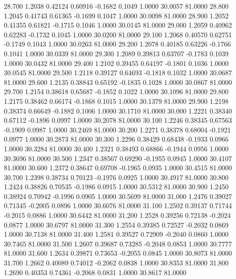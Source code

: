   28.700   1.2038   0.42124   0.60916  -0.1682   0.1049   1.0000  30.0057  81.0000
  28.800   1.2045   0.41743   0.61365  -0.1699   0.1047   1.0000  30.0098  81.0000
  28.900   1.2052   0.41355   0.61821  -0.1715   0.1046   1.0000  30.0145  81.0000
  29.000   1.2059   0.40962   0.62283  -0.1732   0.1045   1.0000  30.0200  81.0000
  29.100   1.2068   0.40570   0.62751  -0.1749   0.1043   1.0000  30.0263  81.0000
  29.200   1.2078   0.40185   0.63226  -0.1766   0.1041   1.0000  30.0339  81.0000
  29.300   1.2089   0.39813   0.63707  -0.1783   0.1039   1.0000  30.0432  81.0000
  29.400   1.2102   0.39455   0.64197  -0.1801   0.1036   1.0000  30.0545  81.0000
  29.500   1.2118   0.39127   0.64693  -0.1818   0.1032   1.0000  30.0687  81.0000
  29.600   1.2135   0.38843   0.65192  -0.1835   0.1028   1.0000  30.0867  81.0000
  29.700   1.2154   0.38618   0.65687  -0.1852   0.1022   1.0000  30.1096  81.0000
  29.800   1.2175   0.38462   0.66174  -0.1868   0.1015   1.0000  30.1379  81.0000
  29.900   1.2198   0.38374   0.66649  -0.1882   0.1006   1.0000  30.1710  81.0000
  30.000   1.2221   0.38340   0.67112  -0.1896   0.0997   1.0000  30.2078  81.0000
  30.100   1.2246   0.38345   0.67563  -0.1909   0.0987   1.0000  30.2469  81.0000
  30.200   1.2271   0.38378   0.68004  -0.1921   0.0977   1.0000  30.2873  81.0000
  30.300   1.2296   0.38429   0.68438  -0.1933   0.0966   1.0000  30.3284  81.0000
  30.400   1.2321   0.38493   0.68866  -0.1944   0.0956   1.0000  30.3696  81.0000
  30.500   1.2347   0.38567   0.69290  -0.1955   0.0945   1.0000  30.4107  81.0000
  30.600   1.2372   0.38647   0.69708  -0.1965   0.0935   1.0000  30.4515  81.0000
  30.700   1.2398   0.38734   0.70123  -0.1976   0.0925   1.0000  30.4917  81.0000
  30.800   1.2424   0.38826   0.70535  -0.1986   0.0915   1.0000  30.5312  81.0000
  30.900   1.2450   0.38924   0.70942  -0.1996   0.0905   1.0000  30.5699  81.0000
  31.000   1.2476   0.39027   0.71345  -0.2005   0.0896   1.0000  30.6076  81.0000
  31.100   1.2502   0.39137   0.71744  -0.2015   0.0886   1.0000  30.6442  81.0000
  31.200   1.2528   0.39256   0.72138  -0.2024   0.0877   1.0000  30.6797  81.0000
  31.300   1.2554   0.39385   0.72527  -0.2032   0.0869   1.0000  30.7138  81.0000
  31.400   1.2581   0.39527   0.72909  -0.2040   0.0860   1.0000  30.7465  81.0000
  31.500   1.2607   0.39687   0.73285  -0.2048   0.0853   1.0000  30.7777  81.0000
  31.600   1.2634   0.39871   0.73653  -0.2055   0.0845   1.0000  30.8073  81.0000
  31.700   1.2662   0.40089   0.74012  -0.2062   0.0838   1.0000  30.8353  81.0000
  31.800   1.2690   0.40353   0.74361  -0.2068   0.0831   1.0000  30.8617  81.0000
